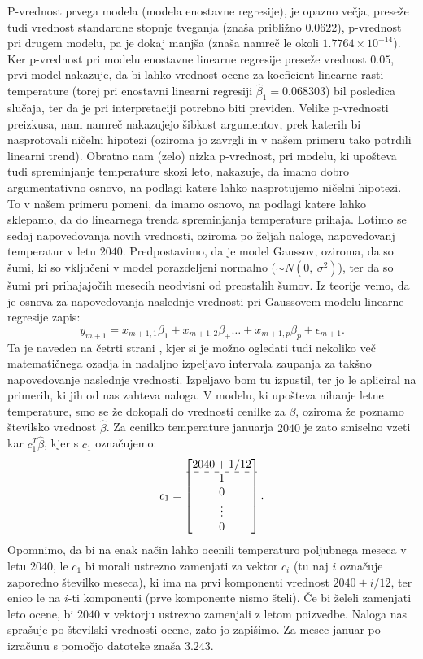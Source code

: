 \documentclass{article}
\begin{document}
P-vrednost prvega modela (modela enostavne regresije), je opazno večja, preseže tudi vrednost standardne stopnje tveganja (znaša približno $0.0622$), p-vrednost pri drugem modelu, pa je dokaj manjša (znaša namreč le okoli $1.7764 \times 10^{-14}$).
Ker p-vrednost pri modelu enostavne linearne regresije preseže vrednost $0.05$, prvi model nakazuje, da bi lahko vrednost ocene za koeficient linearne rasti temperature (torej pri enostavni linearni regresiji $\hat{\beta}_1 = 0.068303$) bil posledica slučaja, ter da je pri interpretaciji potrebno biti previden.
Velike p-vrednosti preizkusa, nam namreč nakazujejo šibkost argumentov, prek katerih bi nasprotovali ničelni hipotezi (oziroma jo zavrgli in v našem primeru tako potrdili linearni trend). 
Obratno nam (zelo) nizka p-vrednost, pri modelu, ki upošteva tudi spreminjanje temperature skozi leto, nakazuje, da imamo dobro argumentativno osnovo, na podlagi katere lahko nasprotujemo ničelni hipotezi. 
To v našem primeru pomeni, da imamo osnovo, na podlagi katere lahko sklepamo, da do linearnega trenda spreminjanja temperature prihaja. 
\newline
\newline
Lotimo se sedaj napovedovanja novih vrednosti, oziroma po željah naloge, napovedovanj temperatur v letu $2040$. Predpostavimo, da je model Gaussov, oziroma, da so šumi, ki so vključeni v model porazdeljeni normalno ($\sim N(0,~\sigma^2)$), ter da so šumi pri prihajajočih mesecih neodvisni od preostalih šumov. 
\newline
Iz teorije vemo, da je osnova za napovedovanja naslednje vrednosti pri Gaussovem modelu linearne regresije zapis:
$$
y_{m+1} = x_{m+1,1}\beta_1 + x_{m+1,2}\beta_ + \dots + x_{m+1,p}\beta_p + \epsilon_{m+1}.
$$
Ta je naveden na četrti strani \cite{lin_reg}, kjer si je možno ogledati tudi nekoliko več matematičnega ozadja in nadaljno izpeljavo intervala zaupanja za takšno napovedovanje naslednje vrednosti. 
Izpeljavo bom tu izpustil, ter jo le apliciral na primerih, ki jih od nas zahteva naloga.
\newline
V modelu, ki upošteva nihanje letne temperature, smo se že dokopali do vrednosti cenilke za $\beta$, oziroma že poznamo številsko vrednost $\hat{\beta}$. 
Za cenilko temperature januarja $2040$ je zato smiselno vzeti kar $c_1^T \hat{\beta}$, kjer s $c_1$ označujemo:
$$
    c_1= \begin{bmatrix}
        2040 + 1/12 \\
        \hdashline
        1\\
        0\\
        \vdots\\
        0
    \end{bmatrix}.
$$
Opomnimo, da bi na enak način lahko ocenili temperaturo poljubnega meseca v letu $2040$, le $c_1$ bi morali ustrezno zamenjati za vektor $c_i$ (tu naj $i$ označuje zaporedno številko meseca), ki ima na prvi komponenti vrednost $2040 + i/12$, ter enico le na $i$-ti komponenti (prve komponente nismo šteli).
Če bi želeli zamenjati leto ocene, bi $2040$ v vektorju ustrezno zamenjali z letom poizvedbe. 
Naloga nas sprašuje po številski vrednosti ocene, zato jo zapišimo.
Za mesec januar po izračunu s pomočjo datoteke znaša $3.243$.
\end{document}
